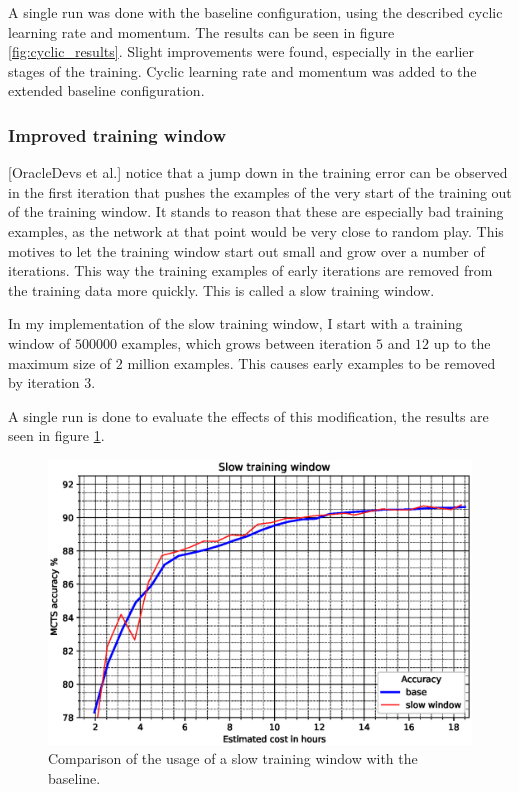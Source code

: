 \documentclass[12pt,onecolumn,oneside,titlepage]{article}
\begin{document}
A single run was done with the baseline configuration, using the described cyclic learning rate and momentum. The results can be seen in figure \ref{fig:cyclic_results}.
Slight improvements were found, especially in the earlier stages of the training. Cyclic learning rate and momentum was added to the extended baseline 
configuration. 



\subsubsection{Improved training window}

\cite{oracledevs6}[OracleDevs et al.] notice that a jump down in the training error can be observed in the first iteration that pushes the examples of the very start of the training out of the training window. It stands to 
reason that these are especially bad training examples, as the network at that point would be very close to random play. This motives to let the training window start out small and grow over a number of iterations. This way the 
training examples of early iterations are removed from the training data more quickly. This is called a slow training window.

In my implementation of the slow training window, I start with a training window of $500000$ examples, which grows between iteration $5$ and $12$ up to the maximum size of $2$ million examples. This causes early examples to be removed by iteration $3$.

A single run is done to evaluate the effects of this modification, the results are seen in figure \ref{fig:slow_window_results}. 

\begin{figure}[H]
\centering
\includegraphics[clip,width=\columnwidth]{slow_window}
\caption{Comparison of the usage of a slow training window with the baseline.}
\label{fig:slow_window_results}
\end{figure}
\end{document}
